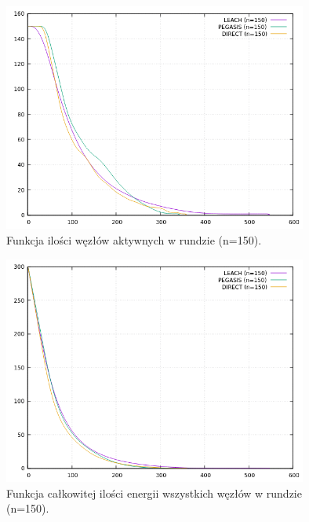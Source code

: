 \documentclass[a4paper,12pt,twoside,openany]{report}
\begin{document}
\begin{figure}[H]
 \centering
 \includegraphics[width=10cm]{images/gnuplot/test_2/nodes_in_round_150.png}
 \caption{Funkcja ilości węzłów aktywnych w rundzie (n=150).}
\end{figure}

\begin{figure}[H]
 \centering
 \includegraphics[width=10cm]{images/gnuplot/test_2/energy_in_round_150.png}
 \caption{Funkcja całkowitej ilości energii wszystkich węzłów w rundzie (n=150).}
\end{figure}
\end{document}
